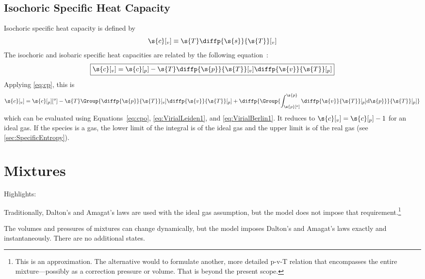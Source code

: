 \subsection{Isochoric Specific Heat Capacity}

Isochoric specific heat capacity is defined by
\begin{equation}
  \label{eq:cvDefinition}
  \s{c}[_v] \equiv \s{T}\diffp{\s{s}}{\s{T}}[_v]
\end{equation}
The isochoric and isobaric specific heat capacities are related by the following equation~\cite{Moran2004}: %
\begin{equation}
  \boxed{\s{c}[_v] = \s{c}[_p] - \s{T}\diffp{\s{p}}{\s{T}}[_v]\diffp{\s{v}}{\s{T}}[_p]}
\end{equation}
Applying \autoref{eq:cp}, this is
\begin{equation}
  \s{c}[_v] = \s{c}[_p][^o]- \s{T}\Group{\diffp{\s{p}}{\s{T}}[_v]\diffp{\s{v}}{\s{T}}[_p] + \diffp{\Group{\int_{\s{p}[^o]}^{\s{p}}\diffp{\s{v}}{\s{T}}[_p]\mathrm{d}\s{p}}}{\s{T}}[_p]}%
\end{equation}
which can be evaluated using Equations~\ref{eq:cpo}, \ref{eq:VirialLeiden1}, and \ref{eq:VirialBerlin1}.  It reduces to $\s{c}[_v] = \s{c}[_p] - 1$ for an ideal gas.  If the species is a gas, the lower limit of the integral is of the ideal gas and the upper limit is of the real gas (see \autoref{sec:SpecificEntropy}).


\section{Mixtures}
\label{sec:Mixtures}

\begin{contextbox}
  Highlights:
  \begin{itemize*}
    \item Traditionally, Dalton's and Amagat's laws are used with the ideal gas assumption, but the model does not impose that requirement.\footnote{This is an approximation.  The alternative would to formulate another, more detailed p-v-T relation that encompasses the entire mixture---possibly as a correction pressure or volume.  That is beyond the present scope.}
    \item The volumes and pressures of mixtures can change dynamically, but the model imposes Dalton's and Amagat's laws exactly and instantaneously.  %
    There are no additional states.
  \end{itemize*}
\end{contextbox}
\vspace{0.7\baselineskip}

